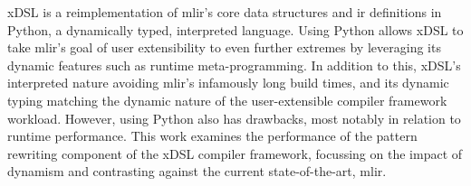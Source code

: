 
xDSL \cite{fehrXDSLSidekickCompilation2025} is a reimplementation of \ac{mlir}'s core data structures and \ac{ir} definitions in Python, a dynamically typed, interpreted language.
Using Python allows xDSL to take \ac{mlir}'s goal of user extensibility to even further extremes by leveraging its dynamic features such as runtime meta-programming.
In addition to this, xDSL's interpreted nature avoiding \ac{mlir}'s infamously long build times, and its dynamic typing matching the dynamic nature of the user-extensible compiler framework workload.
However, using Python also has drawbacks, most notably in relation to runtime performance.
This work examines the performance of the pattern rewriting component of the xDSL compiler framework, focussing on the impact of dynamism and contrasting against the current state-of-the-art, \ac{mlir}.





